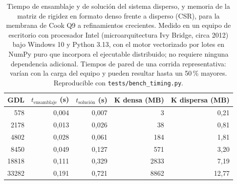 \begin{table}[htbp]
\centering
\caption[Tiempos de ensamblaje y solución, y memoria de la matriz de rigidez (Cook Q9).]{Tiempo de ensamblaje y de solución del sistema disperso, y memoria de la matriz de rigidez en formato denso frente a disperso (CSR), para la membrana de Cook Q9 a refinamientos crecientes. Medido en un equipo de escritorio con procesador Intel (microarquitectura Ivy Bridge, circa 2012) bajo Windows 10 y Python 3.13, con el motor vectorizado por lotes en NumPy puro que incorpora el ejecutable distribuido; no requiere ninguna dependencia adicional. Tiempos de pared de una corrida representativa: varían con la carga del equipo y pueden resultar hasta un 50\,\% mayores. Reproducible con \texttt{tests/bench\_timing.py}.}
\label{tab:tiempos}
\begin{tabular}{r r r r r}
\hline
GDL & $t_{\text{ensamblaje}}$ (s) & $t_{\text{solución}}$ (s) & $\bm{K}$ densa (MB) & $\bm{K}$ dispersa (MB) \\
\hline
578   & 0,004 & 0,007 & 3    & 0,21  \\
2178  & 0,013 & 0,026 & 38   & 0,81  \\
4802  & 0,028 & 0,061 & 184  & 1,81  \\
8450  & 0,049 & 0,127 & 571  & 3,20  \\
18818 & 0,111 & 0,329 & 2833 & 7,19  \\
33282 & 0,191 & 0,721 & 8862 & 12,77 \\
\hline
\end{tabular}
\end{table}

